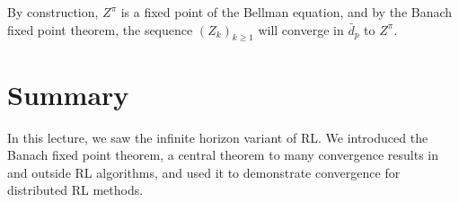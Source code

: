 \documentclass{article}
\begin{document}
By construction, $Z^\pi$ is a fixed point of the Bellman equation, and by the Banach fixed point theorem, the sequence $(Z_k)_{k\geq1}$ will converge in $\bar{d}_p$ to $Z^\pi$.


\section{Summary}

In this lecture, we saw the infinite horizon variant of RL. We introduced the Banach fixed point theorem, a central theorem to many convergence results in and outside RL algorithms, and used it to demonstrate convergence for distributed RL methods.




\end{document}
